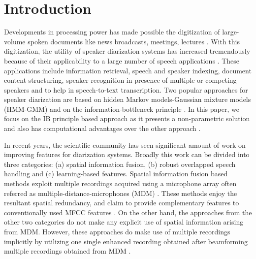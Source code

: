 \documentclass[conference]{IEEEtran}
\begin{document}


\section{Introduction}
\label{intro}

Developments in processing power has made possible the digitization of
large-volume spoken documents like news broadcasts, meetings, lectures 
\cite{reviewPaper2,reviewPaper3}. With this digitization, the utility of speaker
diarization systems has increased tremendously because of their applicability to a large 
number of speech applications \cite{reviewPaper1,reviewPaper4}. These applications 
include information retrieval, speech and speaker indexing, 
document content structuring, speaker recognition in presence of multiple or
competing speakers and to help in speech-to-text transcription. Two popular
approaches for speaker diarization are based on hidden Markov models-Gaussian
mixture models (HMM-GMM) and on
the information-bottleneck principle \cite{reviewPaper1,aIB2}. In this paper, we focus on the IB principle based approach as it presents a non-parametric solution and also has computational advantages over the
other approach \cite{aIB2}.

In recent years, the scientific community has seen significant amount of work on
improving features for diarization systems. Broadly this work can be divided
into three categories: (a) spatial information fusion, (b) 
robust overlapped speech handling and (c) learning-based features. Spatial
information fusion based methods exploit multiple recordings acquired using a microphone array often 
referred as multiple-distance-microphones (MDM) \cite{aIB3,aIB4,featAngle,speakerUPM,featSpatial,MDM}. 
These methods enjoy the resultant spatial redundancy, and claim to provide complementary features to
conventionally used MFCC features \cite{MDM}. On the other hand, the approaches from the other two categories do not make any explicit use of spatial information arising from MDM. However, these approaches do make use of multiple recordings implicitly by utilizing one single enhanced recording obtained after beamforming multiple recordings obtained from MDM \cite{beamforming}.
\end{document}

